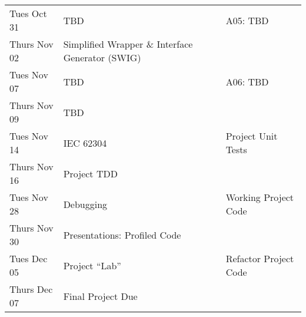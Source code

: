 \begin{longtable}[c]{|l|l|l|}
    Tues Oct 31     & TBD & A05: TBD \\
    Thurs Nov 02    & Simplified Wrapper \& Interface Generator (SWIG) & \\
    \hline
    Tues Nov 07     & TBD & A06: TBD \\
    Thurs Nov 09    & TBD & \\
    \hline
    Tues Nov 14     & IEC 62304 & Project Unit Tests \\
    Thurs Nov 16    & Project TDD & \\
    \hline
    Tues Nov 28     & Debugging & Working Project Code \\
    Thurs Nov 30    & Presentations: Profiled Code & \\
    \hline
    Tues Dec 05     & Project ``Lab'' & Refactor Project Code \\
    Thurs Dec 07    & Final Project Due & \\
    \hline

\end{longtable}
